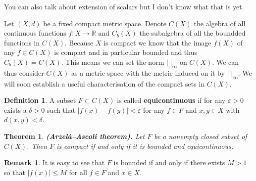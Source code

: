 \documentclass[11pt,a4paper]{article}
\theoremstyle{definition}
\newtheorem{definition}{Definition}[section]
\newtheorem{remark}{Remark}[section]
\theoremstyle{plain}
\newtheorem{theorem}{Theorem}[section]
\newcommand{\R}{\mathbb{R}}
\newcommand{\abs}[1]{\left\lvert #1\right\rvert}
\renewcommand{\tt}[1]{\textnormal{\textbf{(#1).}}} %
\begin{document}
	You can also talk about extension of scalars but I don't know what
	that is yet.
	
	Let $(X,d)$ be a fixed compact metric space. Denote $C(X)$ the algebra
	of all continuous functions $f \colon X \to \R$ and $C_b(X)$ the
	subalgebra of all the boundded functions in $C(X)$. Because $X$
	is compact we know that the image $f(X)$ of any $f \in C(X)$ is compact
	and in particular bounded and thus $C_b(X) = C(X)$. This means we can set 
	the norm $|\cdot|_\infty$ on $C(X)$. We can thus consider $C(X)$ as
	a metric space with the metric induced on it by $|\cdot|_\infty$.
	We will soon establish a useful characterisation of the compact sets
	in $C(X)$.
	\begin{definition}
		A subset $F \subset C(X)$ is called \textbf{equicontinuous} if
		for any $\varepsilon > 0$ exists a $\delta > 0$ such that
		$\abs{f(x) - f(y)} < \varepsilon$ for any $f \in F$ and $x,y \in X$ with
		$d(x,y) < \delta$.
	\end{definition}
	\begin{theorem}
		\tt{Arzelà–Ascoli theorem} Let $F$ be a nonempty closed subset of 
		$C(X)$. Then $F$ is compact if and only if it is bounded and 
		equicontinuous.
	\end{theorem}
	\begin{remark}
		It is easy to see that $F$ is bounded if and only if there exists 
		$M > 1$ so that $|f (x)| \le M$ for all $f \in F$ and $x \in X$.
	\end{remark}
	 
	\newpage
	
\end{document}
